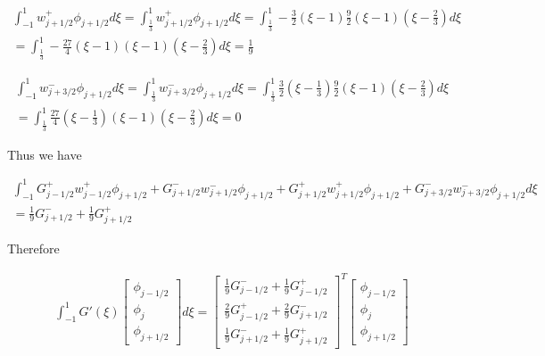 \documentclass[12pt]{article}
\begin{document}
\begin{multline*}
\int_{-1}^{1}w^+_{j + 1/2}\phi_{j+ 1/2} d\xi = \int_{\frac{1}{3}}^{1}w^+_{j + 1/2}\phi_{j+ 1/2} d\xi = \int_{\frac{1}{3}}^{1} -\frac{3}{2}\left(\xi - 1\right)\frac{9}{2}\left(\xi -1\right) \left(\xi - \frac{2}{3}\right) d\xi \\= \int_{\frac{1}{3}}^{1} -\frac{27}{4}\left(\xi - 1\right)\left(\xi -1\right) \left(\xi - \frac{2}{3}\right) d\xi = \frac{1}{9} 
\end{multline*}

\begin{multline*}
\int_{-1}^{1}w^-_{j + 3/2}\phi_{j+ 1/2} d\xi = \int_{\frac{1}{3}}^{1}w^-_{j + 3/2}\phi_{j+ 1/2} d\xi = \int_{\frac{1}{3}}^{1} \frac{3}{2}\left(\xi - \frac{1}{3}\right)\frac{9}{2}\left(\xi -1\right) \left(\xi - \frac{2}{3}\right) d\xi \\= \int_{\frac{1}{3}}^{1} \frac{27}{4}\left(\xi - \frac{1}{3}\right)\left(\xi -1\right) \left(\xi - \frac{2}{3}\right) d\xi = 0 
\end{multline*}

Thus we have

\begin{multline*}
\int_{-1}^{1}G^+_{j - 1/2}w^+_{j - 1/2}\phi_{j+ 1/2} + G^-_{j + 1/2}w^-_{j + 1/2}\phi_{j+ 1/2} + G^+_{j + 1/2}w^+_{j + 1/2}\phi_{j+ 1/2} + G^-_{j + 3/2}w^-_{j + 3/2}\phi_{j+ 1/2}  d\xi \\ = \frac{1}{9}G^-_{j + 1/2} + \frac{1}{9}G^+_{j + 1/2} 
\end{multline*}

Therefore

\begin{multline*}
\int_{-1}^{1}G'(\xi)\left[\begin{array}{c}\phi_{j-1/2} \\\phi_{j}\\\phi_{j+1/2} \end{array}\right] d\xi =  \left[\begin{array}{c}\frac{1}{9}G^-_{j - 1/2}  + \frac{1}{9}G^+_{j - 1/2}  \\ \frac{2}{9} G^+_{j - 1/2} + \frac{2}{9} G^-_{j + 1/2}\\ \frac{1}{9}G^-_{j + 1/2} + \frac{1}{9}G^+_{j + 1/2} \end{array}\right]^T \left[\begin{array}{c}\phi_{j-1/2} \\\phi_{j}\\\phi_{j+1/2} \end{array}\right]\\
\end{multline*}
\end{document}
